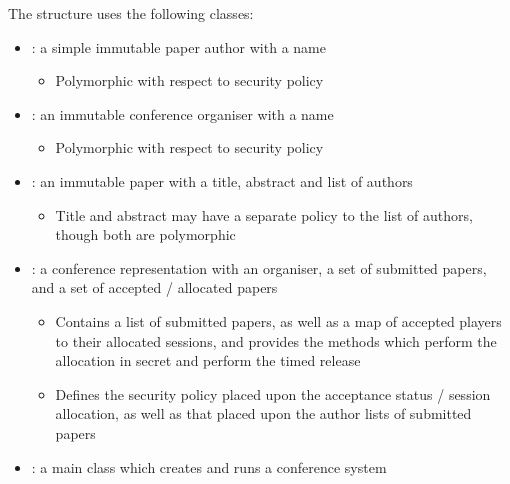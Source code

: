 The structure uses the following classes:

\begin{itemize}
	
	\item {}: a simple immutable paper author with a name
	
	\begin{itemize}
		\item Polymorphic with respect to security policy
	\end{itemize}
	
	\item {}: an immutable conference organiser with a name
	
	\begin{itemize}
		\item Polymorphic with respect to security policy
	\end{itemize}
	
	\item {}: an immutable paper with a title, abstract and list of authors
	
	\begin{itemize}
		\item Title and abstract may have a separate policy to the list of authors, though both are polymorphic
	\end{itemize}
	
	\item {}: a conference representation with an organiser, a set of submitted papers, and a set of accepted / allocated papers
	
	\begin{itemize}
		\item Contains a list of submitted papers, as well as a map of accepted players to their allocated sessions, and provides the methods which perform the allocation in secret and perform the timed release
		
		\item Defines the security policy placed upon the acceptance status / session allocation, as well as that placed upon the author lists of submitted papers
	\end{itemize}
	
	\item {}: a main class which creates and runs a conference system
	 
\end{itemize}

\newpage

